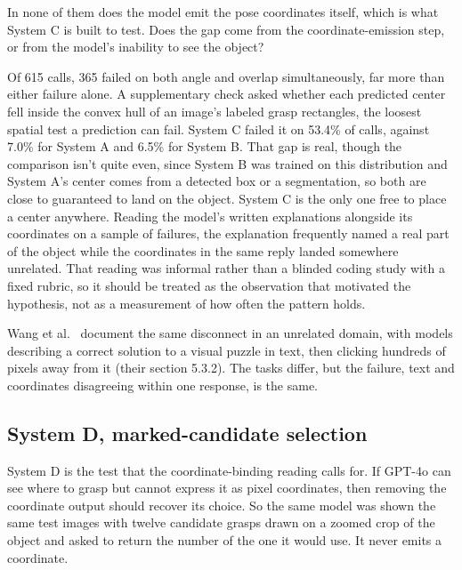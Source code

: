 \documentclass[12pt,letterpaper]{article}
\begin{document}
In none of them does the model emit the pose coordinates itself, which
is what System C is built to test. Does the gap come from the
coordinate-emission step, or from the model's inability to see the
object?

Of 615 calls, 365 failed on both angle and overlap simultaneously, far
more than either failure alone. A supplementary check asked whether
each predicted center fell inside the convex hull of an image's labeled
grasp rectangles, the loosest spatial test a prediction can fail.
System C failed it on 53.4\% of calls, against 7.0\% for System A and
6.5\% for System B. That gap is real, though the comparison isn't quite
even, since System B was trained on this distribution and System A's
center comes from a detected box or a segmentation, so both are close
to guaranteed to land on the object. System C is the only one free to
place a center anywhere. Reading the model's written explanations
alongside its coordinates on a sample of failures, the explanation
frequently named a real part of the object while the coordinates in the
same reply landed somewhere unrelated. That reading was informal rather
than a blinded coding study with a fixed rubric, so it should be
treated as the observation that motivated the hypothesis, not as a
measurement of how often the pattern holds.

Wang et al.~\cite{wang2025} document the same disconnect in an unrelated domain, with
models describing a correct solution to a visual puzzle in text, then
clicking hundreds of pixels away from it (their section 5.3.2). The
tasks differ, but the failure, text and coordinates disagreeing within
one response, is the same.

\subsection{System D, marked-candidate selection}

System D is the test that the coordinate-binding reading calls for. If
GPT-4o can see where to grasp but cannot express it as pixel
coordinates, then removing the coordinate output should recover its
choice. So the same model was shown the same test images with twelve
candidate grasps drawn on a zoomed crop of the object and asked to
return the number of the one it would use. It never emits a coordinate.
\end{document}

